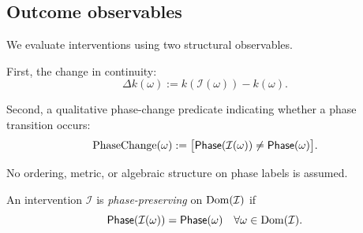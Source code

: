 \subsection{Outcome observables}

We evaluate interventions using two structural observables.

First, the change in continuity:
\[
\Delta k(\omega) := k(\mathcal{I}(\omega)) - k(\omega).
\]

Second, a qualitative phase-change predicate indicating whether a phase
transition occurs:
\[
\text{PhaseChange}(\omega) :=
\bigl[\mathsf{Phase}(\mathcal{I}(\omega)) \neq \mathsf{Phase}(\omega)\bigr].
\]

No ordering, metric, or algebraic structure on phase labels is assumed.

\begin{definition}
An intervention $\mathcal{I}$ is \emph{phase-preserving} on $\operatorname{Dom}(\mathcal{I})$ if
\[
\mathsf{Phase}(\mathcal{I}(\omega))=\mathsf{Phase}(\omega)
\quad \forall \omega\in\operatorname{Dom}(\mathcal{I}).
\]
\end{definition}

